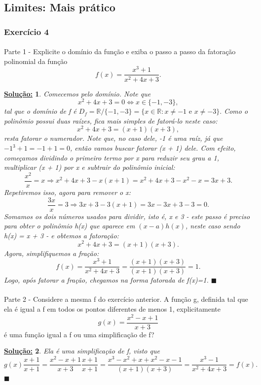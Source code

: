 \documentclass{article}
\newtheorem*{sol*}{\underline{Solu\c c\~ao:}}
\renewcommand\qedsymbol{$\blacksquare$}
\begin{document}
\subsection{Limites: Mais pr\'atico}
\subsubsection{Exerc\'icio 4}
\paragraph{} Parte 1 - Explicite o dom\'inio da fun\c c\~ao e exiba o passo a passo da fatora\c c\~ao polinomial da fun\c c\~ao
$$
	f(x) = \frac{x^3 + 1}{x^2  + 4x + 3}.
$$
\begin{sol*}
	Comecemos pelo dom\'inio. Note que
	$$
		x^2 + 4x + 3 = 0 \iff x\in\{-1, -3\},
	$$
	tal que o dom\'inio de f \'e $D_f = \mathbb{R}\slash\{-1, -3\} = \{x\in\mathbb{R}: x\neq{-1} \text{ e } x\neq{-3}\}.$ Como o polin\^omio possui duas ra\'izes, fica mais simples de fator\'a-lo neste caso:
	$$
		x^2 + 4x + 3 = (x + 1)(x + 3),
	$$
	resta fatorar o numerador. Note que, no caso dele, -1 \'e uma ra\'iz, j\'a que $-1^3 + 1 = -1 + 1 = 0$, ent\~ao vamos buscar fatorar (x + 1) dele. Com efeito, come\c camos dividindo o primeiro termo por x para reduzir seu grau a 1, multiplicar (x + 1) por x e subtrair do polin\^omio inicial:
	$$
		\frac{x^2}{x} = x \Rightarrow x^2 + 4x + 3 - x(x + 1) = x^2 + 4x + 3 - x^2 - x = 3x + 3.
	$$
	Repetiremos isso, agora para remover o x:
	$$
		\frac{3x}{x} = 3 \Rightarrow 3x + 3 - 3(x + 1) = 3x - 3x + 3 - 3 = 0.
	$$
	Somamos os dois n\'umeros usados para dividir, isto \'e, x e 3 - este passo \'e preciso para obter o polin\^omio h(x) que aparece em $(x - a)h(x)$, neste caso sendo h(x) = x + 3 - e obtemos a fatora\c c\~ao:
	$$
		x^2 + 4x + 3 = (x + 1)(x + 3).
	$$
	Agora, simplifiquemos a fra\c c\~ao:
	$$
		f(x) = \frac{x^3 + 1}{x^2  + 4x + 3} = \frac{(x + 1)(x + 3)}{(x + 1)(x + 3)} = 1.
	$$
	Logo, ap\'os fatorar a fra\c c\~ao, chegamos na forma fatorada de f(x)=1.
	\qedsymbol
\end{sol*}

\paragraph{} Parte 2 - Considere a mesma f do exerc\'icio anterior. A fun\c c\~ao g, definida tal que ela \'e igual a f em todos os pontos diferentes de menos 1, explicitamente
$$
	g(x) = \frac{x^2 - x + 1}{x + 3}
$$
\'e uma fun\c c\~ao igual a f ou uma simplifica\c c\~ao de f?
\begin{sol*}
	Ela \'e uma simplifica\c c\~ao de f, visto que
	$$
		g(x)\frac{x+1}{x+1} = \frac{x^2 - x + 1}{x + 3}\frac{x+1}{x+1} = \frac{x^3 - x^2 + x + x^2 - x - 1}{(x+1)(x+3)} = \frac{x^3 - 1}{x^2 + 4x + 3} = f(x).
	$$
	\qedsymbol
\end{sol*}
\end{document}
